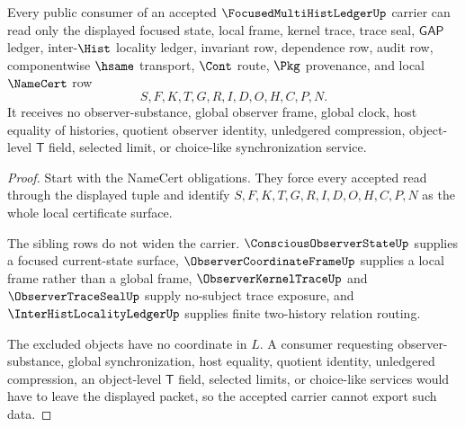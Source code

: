 \begin{theorem}
\label{thm:focused-multi-hist-ledger-nonescape}
Every public consumer of an accepted $\FocusedMultiHistLedgerUp$ carrier can read only the displayed focused state, local frame, kernel trace, trace seal, $\mathsf{GAP}$ ledger, inter-$\Hist$ locality ledger, invariant row, dependence row, audit row, componentwise $\hsame$ transport, $\Cont$ route, $\Pkg$ provenance, and local $\NameCert$ row
$$
S,F,K,T,G,R,I,D,O,H,C,P,N.
$$
It receives no observer-substance, global observer frame, global clock, host equality of histories, quotient observer identity, unledgered compression, object-level $\mathsf{T}$ field, selected limit, or choice-like synchronization service.
\end{theorem}
\begin{proof}
Start with the NameCert obligations. They force every accepted read through the displayed tuple and identify $S,F,K,T,G,R,I,D,O,H,C,P,N$ as the whole local certificate surface.

The sibling rows do not widen the carrier. $\ConsciousObserverStateUp$ supplies a focused current-state surface, $\ObserverCoordinateFrameUp$ supplies a local frame rather than a global frame, $\ObserverKernelTraceUp$ and $\ObserverTraceSealUp$ supply no-subject trace exposure, and $\InterHistLocalityLedgerUp$ supplies finite two-history relation routing.

The excluded objects have no coordinate in $L$. A consumer requesting observer-substance, global synchronization, host equality, quotient identity, unledgered compression, an object-level $\mathsf{T}$ field, selected limits, or choice-like services would have to leave the displayed packet, so the accepted carrier cannot export such data.
\end{proof}

